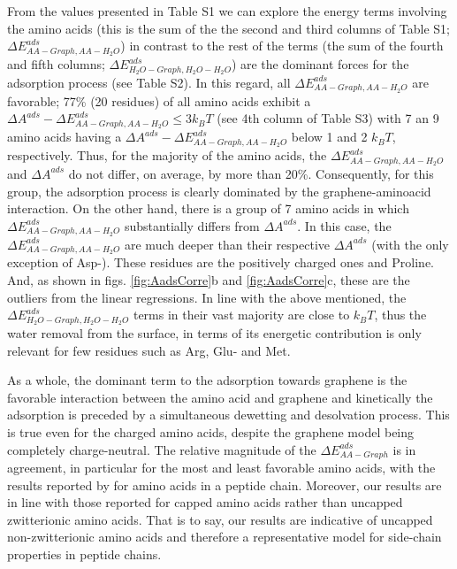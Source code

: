 \documentclass[journal=jcisd8,manuscript=article,layout=twocolumn]{achemso}
\begin{document}
From the values presented in Table S1 we can explore the energy terms involving the amino acids (this is the sum of the the second and third columns of Table S1; $\Delta E^{ads}_{AA-Graph, AA-H_2O}$) in contrast to the rest of the terms (the sum of the fourth and fifth columns; $\Delta E^{ads}_{H_2O-Graph, H_2O-H_2O}$) are the dominant forces for the adsorption process (see Table S2).
In this regard, all $\Delta E^{ads}_{AA-Graph, AA-H_2O}$  are favorable; 77\% (20 residues) of all amino acids exhibit a $\Delta A^{ads}-\Delta E^{ads}_{AA-Graph, AA-H_2O} \leq 3k_BT$ (see 4th column of Table S3) with 7 an 9 amino acids  having a $\Delta A^{ads}-\Delta E^{ads}_{AA-Graph, AA-H_2O}$ below 1 and 2 $k_BT$, respectively.
Thus, for the majority of the amino acids, the $\Delta E^{ads}_{AA-Graph, AA-H_2O}$ and $\Delta A^{ads}$ do not differ, on average, by more than 20\%.
Consequently, for this group, the adsorption process is clearly dominated by the graphene-aminoacid interaction.
On the other hand, there is a group of 7 amino acids in which $\Delta E^{ads}_{AA-Graph, AA-H_2O}$ substantially differs from $\Delta A^{ads}$.
In this case, the $\Delta E^{ads}_{AA-Graph, AA-H_2O}$ are much deeper than their respective $\Delta A^{ads}$ (with the only exception of Asp-).
These residues are the positively charged ones and Proline.
And, as shown in figs. \ref{fig:AadsCorre}b and \ref{fig:AadsCorre}c, these are the outliers from the linear regressions.
In line with the above mentioned, the $\Delta E^{ads}_{H_2O-Graph, H_2O-H_2O}$ terms in their vast majority are close to $k_BT$, thus the water removal from the surface, in terms of its energetic contribution is only relevant for few residues such as Arg, Glu- and Met.

As a whole, the dominant term to the adsorption towards graphene is the favorable interaction between the amino acid and  graphene and kinetically the adsorption is preceded by a simultaneous dewetting and desolvation process. This is true even for the charged amino acids, despite the graphene model being completely charge-neutral. The relative magnitude of the $\Delta E^{ads}_{AA-Graph}$ is in agreement, in particular for the most and least favorable amino acids, with the results reported by \citet{Pandey_2012} for amino acids in a peptide chain. Moreover, our results are in line with those reported for capped amino acids rather than uncapped zwitterionic amino acids.\cite{Dragneva_2013}
That is to say, our results are indicative of uncapped non-zwitterionic amino acids and therefore a representative  model for side-chain properties in peptide chains.
\end{document}
